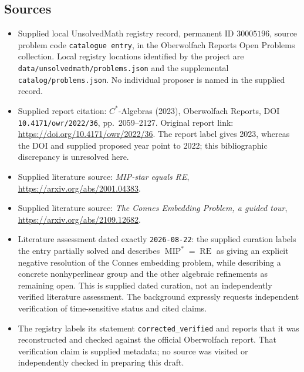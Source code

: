 \documentclass[11pt]{article}
\begin{document}
\subsection{Sources}
\begin{itemize}
\item Supplied local UnsolvedMath registry record, permanent ID \(30005196\), source problem code \texttt{catalogue entry}, in the Oberwolfach Reports Open Problems collection. Local registry locations identified by the project are \texttt{data/unsolvedmath/problems.json} and the supplemental \texttt{catalog/problems.json}. No individual proposer is named in the supplied record.
\item Supplied report citation: \(C^*\)-Algebras (2023), Oberwolfach Reports, DOI \texttt{10.4171/owr/2022/36}, pp.\ 2059--2127. Original report link: \url{https://doi.org/10.4171/owr/2022/36}. The report label gives 2023, whereas the DOI and supplied proposed year point to 2022; this bibliographic discrepancy is unresolved here.
\item Supplied literature source: \emph{MIP-star equals RE}, \url{https://arxiv.org/abs/2001.04383}.
\item Supplied literature source: \emph{The Connes Embedding Problem, a guided tour}, \url{https://arxiv.org/abs/2109.12682}.
\item Literature assessment dated exactly \texttt{2026-08-22}: the supplied curation labels the entry partially solved and describes \(\operatorname{MIP}^{*}=\operatorname{RE}\) as giving an explicit negative resolution of the Connes embedding problem, while describing a concrete nonhyperlinear group and the other algebraic refinements as remaining open. This is supplied dated curation, not an independently verified literature assessment. The background expressly requests independent verification of time-sensitive status and cited claims.
\item The registry labels its statement \texttt{corrected\_verified} and reports that it was reconstructed and checked against the official Oberwolfach report. That verification claim is supplied metadata; no source was visited or independently checked in preparing this draft.
\end{itemize}
\end{document}
